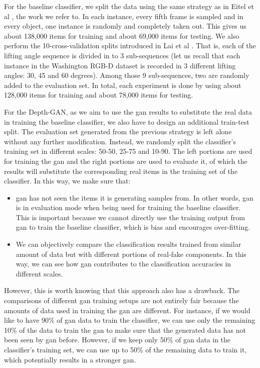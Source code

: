 For the baseline classifier, we split the data using the same strategy as in Eitel et al
\cite{eitel}, the work we refer to. In each instance, every fifth frame is sampled
and in every object, one instance is randomly and completely taken out. This gives us
about 138,000 items for training and about 69,000 items for testing.  We also perform the
10-cross-validation splits introduced in Lai et al \cite{washington_rgbd}. That is, each of the
lifting angle sequence is divided in to 3 sub-sequences (let us recall that each instance
in the Washington RGB-D dataset is recorded in 3 different lifting angles: 30, 45 and 60
degrees). Among those 9 sub-sequences, two are randomly added to the evaluation set. In
total, each experiment is done by using about 128,000 items for training and about 78,000
items for testing.

For the Depth-GAN, as we aim to use the \acrshort{gan} results to substitute
the real data in training the baseline classifier, we also have to design an additional
train-test split. The evaluation set generated from the previous strategy is left alone
without any further modification. Instead, we randomly split the classifier's training set
in different scales: 50-50, 25-75 and 10-90. The left portions are used for training the
\acrshort{gan} and the right portions are used to evaluate it, of which the results will
substitute the corresponding real items in the training set of the classifier. In this
way, we make sure that:

\begin{itemize}
	\item \acrshort{gan} has not seen the items it is generating samples from. In
		other words, \acrshort{gan} is in evaluation mode when being used for training the
		baseline classifier. This is important because we cannot directly use the training output
		from \acrshort{gan} to train the baseline classifier, which is bias and encourages over-fitting.
	\item We can objectively compare the classification results trained from similar
		amount of data but with different portions of real-fake components. In this way,
		we can see how \acrshort{gan} contributes to the classification accuracies in
		different scales.
\end{itemize}

However, this is worth knowing that this approach also has a drawback. The comparisons of
different \acrshort{gan} training setups are not entirely fair because the amounts of data
used in training the \acrshort{gan} are different. For instance, if we would like to have
90\% of \acrshort{gan} data to train the classifier, we can use only the remaining 10\% of
the data to train the \acrshort{gan} to make sure that the generated data has not been
seen by \acrshort{gan} before. However, if we keep only 50\% of \acrshort{gan} data in the
classifier's training set, we can use up to 50\% of the remaining data to train it, which
potentially results in a stronger \acrshort{gan}. 

